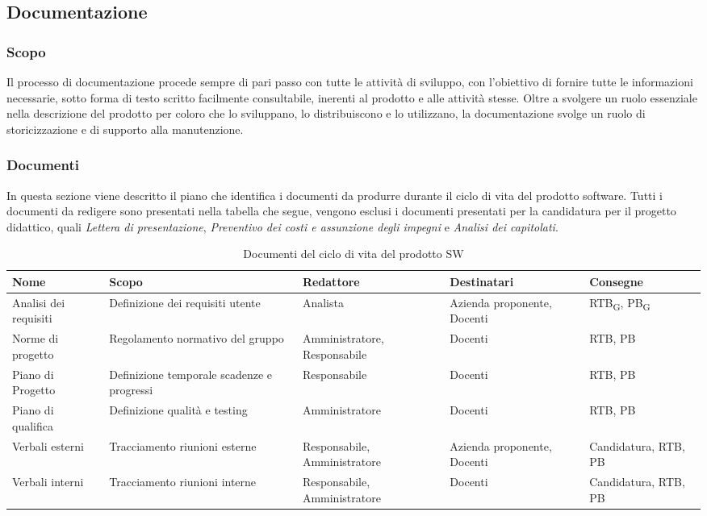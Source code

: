 \subsection{Documentazione}
\subsubsection{Scopo}
Il processo di documentazione procede sempre di pari passo con tutte le attività di sviluppo, con l'obiettivo di fornire tutte le informazioni necessarie, sotto forma di testo scritto facilmente consultabile, inerenti al prodotto e alle attività stesse. Oltre a svolgere un ruolo essenziale nella descrizione del prodotto per coloro che lo sviluppano, lo distribuiscono e lo utilizzano, la documentazione svolge un ruolo di storicizzazione e di supporto alla manutenzione. 

\subsubsection{Documenti}
In questa sezione viene descritto il piano che identifica i documenti da produrre durante il ciclo di vita del prodotto software. Tutti i documenti da redigere sono presentati nella tabella che segue, vengono esclusi i documenti presentati per la candidatura per il progetto didattico, quali \textit{Lettera di presentazione}, \textit{Preventivo dei costi e assunzione degli impegni} e \textit{Analisi dei capitolati}.


\begin{table}[H]
    \centering
   \begin{tabularx}{\textwidth}{X|X|>{\hsize=1.2\hsize}X|X|>{\hsize=0.8\hsize}X}
        \textbf{Nome} & \textbf{Scopo} & \textbf{Redattore} & \textbf{Destinatari} & \textbf{Consegne} \\ \hline
        Analisi dei requisiti    & Definizione dei requisiti utente    & Analista & Azienda proponente, Docenti & RTB\textsubscript{G}, PB\textsubscript{G}    \\ \hline
        Norme di progetto    & Regolamento normativo del gruppo    & Amministratore, Responsabile &  Docenti & RTB, PB    \\ \hline
        Piano di Progetto   & Definizione temporale scadenze e progressi    & Responsabile &  Docenti & RTB, PB   \\ \hline
        Piano di qualifica   & Definizione qualità e testing    & Amministratore &  Docenti & RTB, PB   \\ \hline
         Verbali esterni   & Tracciamento riunioni esterne   & Responsabile, Amministratore &  Azienda proponente, Docenti & Candidatura, RTB, PB   \\ \hline
         Verbali interni   & Tracciamento riunioni interne   & Responsabile, Amministratore &  Docenti & Candidatura, RTB, PB  
       
    \end{tabularx}
    \caption{Documenti del ciclo di vita del prodotto SW}
\end{table}


